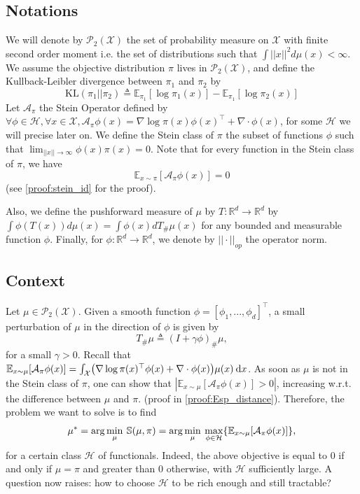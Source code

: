 \documentclass{article}
\newcommand{\R}{\mathbb{R}}
\newcommand{\E}{\mathbb{E}}
\renewcommand{\S}{\mathbb{S}}
\newcommand{\X}{\mathcal{X}}
\newcommand{\A}{\mathcal{A}}
\renewcommand{\P}{\mathcal{P}}
\newcommand{\KL}{\mathrm{KL}}
\renewcommand{\H}{\mathcal{H}}
\renewcommand{\S}{\mathbb{S}}
\renewcommand{\d}{\: \mathrm{d}}
\DeclarePairedDelimiter{\pare}{(}{)}
\DeclarePairedDelimiter{\bra}{\{}{\}}
\begin{document}
\subsection{Notations}
We will denote by $\P_2(\X)$ the set of probability measure on $\X$ with finite second order moment i.e. the set of distributions such that $\int ||x||^2 d\mu(x) < \infty$. We assume the objective distribution $\pi$ lives in $\P_2(\X)$, and define the Kullback-Leibler divergence between $\pi_1$ and $\pi_2$ by
$$\KL(\pi_1||\pi_2) \triangleq \E_{\pi_1} [\log \pi_1(x)] - \E_{\pi_1}[\log \pi_2(x)]$$ \newline
Let $\A_\pi$ the Stein Operator defined by $\forall \phi \in \H, \forall x \in \X, \A_\pi \phi(x) = \nabla \log \pi(x) \phi(x)^\top + \nabla\cdot \phi(x)$, for some $\H$ we will precise later on. \newline
We define the Stein class of $\pi$ the subset of functions $\phi$ such that $\lim_{||x||\longrightarrow \infty} \phi(x)\pi(x) = 0$. Note that for every function in the Stein class of $\pi$, we have \begin{equation}
  \E_{x \sim \pi}[\A_\pi \phi (x)] = 0
  \label{eq:stein_id}
\end{equation}
(see \ref{proof:stein_id} for the proof).\newline

Also, we define the pushforward measure of $\mu$ by $T:\R^d \longrightarrow \R^d$ by $\int \phi(T(x)) d\mu(x) = \int \phi(x) dT_\#\mu(x)$ for any bounded and measurable function $\phi$. \newline
Finally, for $\phi : \R^d \longrightarrow \R^d$, we denote by $||\cdot||_{op}$ the operator norm. \newline

\subsection{Context}
Let $\mu \in \P_2(\X)$. Given a smooth function $\phi = [\phi_1,...,\phi_d]^\top$, a small perturbation of $\mu$ in the direction of $\phi$ is given by 
\begin{equation}
    T_\#\mu \triangleq (I+\gamma \phi)_\#\mu,
\end{equation}
for a small $\gamma > 0$. \newline
Recall that $\E_{x \sim \mu}[\A_\pi \phi (x)] = \int_\X \pare*{ \nabla \log \pi(x)^\top \phi(x) + \nabla \cdot \phi(x) } \mu(x) \d x$. 
As soon as $\mu$ is not in the Stein class of $\pi$, one can show that $\left | \E_{x \sim \mu}[\A_\pi \phi (x)] > 0 \right |$, increasing w.r.t. the difference between $\mu$ and $\pi$. (proof in \ref{proof:Esp_distance}). \newline
Therefore, the problem we want to solve is to find
\begin{equation}
  \mu^* = \arg\min_{\mu} \: \S(\mu, \pi) =
    \arg\min_{\mu} \: \max_{\phi \in \H} \bra*{ \E_{x \sim \mu}[\A_\pi \phi (x)] },
  \label{eq:stein_obj}
\end{equation}
for a certain class $\H$ of functionals.
Indeed, the above objective is equal to $0$ if and only if $\mu = \pi$ and greater than $0$ otherwise,
with $\H$ sufficiently large. A question now raises: how to choose $\H$ to be rich enough and
still tractable? \newline
\end{document}
